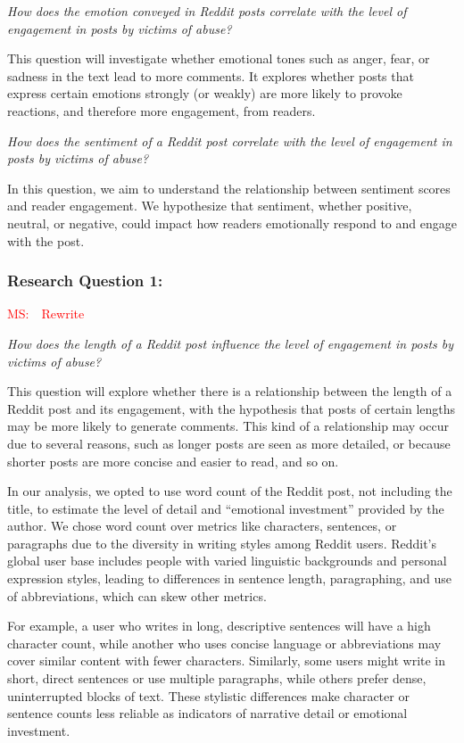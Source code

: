 \documentclass[11pt]{article}
\newcommand{\ms}[1]{\textcolor{red}{{MS:~~#1}}}
\begin{document}
\textit{How does the emotion conveyed in Reddit posts correlate with the level of engagement in posts by victims of abuse?} 

This question will investigate whether emotional tones such as anger, fear, or sadness in the text lead to more comments. 
It explores whether posts that express certain emotions strongly (or weakly) are more likely to provoke reactions, and therefore more engagement, from readers.

\textit{How does the sentiment of a Reddit post correlate with the level of engagement in posts by victims of abuse?}

In this question, we aim to understand the relationship between sentiment scores and reader engagement. 
We hypothesize that sentiment, whether positive, neutral, or negative, could impact how readers emotionally respond to and engage with the post.

\subsubsection{Research Question 1:} \ms{Rewrite}

\textit{How does the length of a Reddit post influence the level of engagement in posts by victims of abuse?} 

This question will explore whether there is a relationship between the length of a Reddit post and its engagement, with the hypothesis that posts of certain lengths may be more likely to generate comments. 
This kind of a relationship may occur due to several reasons, such as longer posts are seen as more detailed, or because shorter posts are more concise and easier to read, and so on.

In our analysis, we opted to use word count of the Reddit post, not including the title, to estimate the level of detail and ``emotional investment'' provided by the author.
We chose word count over metrics like characters, sentences, or paragraphs due to the diversity in writing styles among Reddit users. 
Reddit's global user base includes people with varied linguistic backgrounds and personal expression styles, leading to differences in sentence length, paragraphing, and use of abbreviations, which can skew other metrics. 

For example, a user who writes in long, descriptive sentences will have a high character count, while another who uses concise language or abbreviations may cover similar content with fewer characters. Similarly, some users might write in short, direct sentences or use multiple paragraphs, while others prefer dense, uninterrupted blocks of text. 
These stylistic differences make character or sentence counts less reliable as indicators of narrative detail or emotional investment. 
\end{document}
